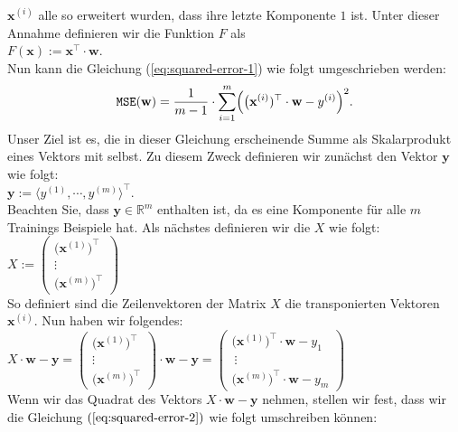 \documentclass[12pt]{article}
\begin{document}
$\mathbf{x}^{(i)}$ alle so erweitert wurden, dass ihre letzte Komponente $1$ ist.  Unter dieser
Annahme definieren wir die
Funktion $F$ als
\\[0.2cm]
\hspace*{1.3cm}
$F(\mathbf{x}) := \mathbf{x}^\top \cdot \mathbf{w}$.
\\[0.2cm]
Nun kann die Gleichung (\ref{eq:squared-error-1}) wie folgt umgeschrieben werden:
\begin{equation}
  \label{eq:squared-error-2}
  \mathtt{MSE}(\mathbf{w}) = \frac{1}{m-1} \cdot \sum\limits_{i=1}^m \Bigl(\bigl(\mathbf{x}^{(i)})^\top \cdot \mathbf{w} - y^{(i)}\Bigr)^2.
\end{equation}
Unser Ziel ist es, die in dieser Gleichung erscheinende Summe als Skalarprodukt eines Vektors mit
selbst.  Zu diesem Zweck definieren wir zunächst den Vektor $\mathbf{y}$ wie folgt:
\\
\hspace*{1.3cm}
$\mathbf{y} := \langle y^{(1)}, \cdots, y^{(m)} \rangle^\top$.
\\[0.2cm]
Beachten Sie, dass $\mathbf{y} \in \mathbb{R}^m$ enthalten ist, da es eine Komponente für alle $m$ Trainings
Beispiele hat.  Als nächstes definieren wir die {\color{blue}{Designmatrix}} $X$ wie folgt:
\\[0.2cm]
\hspace*{1.3cm}
$ X := \left(
  \begin{array}{c}
    \bigl(\mathbf{x}^{(1)}\bigr)^\top \\
    \vdots \\
    \bigl(\mathbf{x}^{(m)}\bigr)^\top
  \end{array}
  \right)   
$
\\[0.2cm]
So definiert sind die Zeilenvektoren der Matrix $X$ die transponierten Vektoren $\mathbf{x}^{(i)}$.
Nun haben wir folgendes:
\\[0.2cm]
\hspace*{1.3cm}
$X \cdot \mathbf{w} - \mathbf{y} = \left(
  \begin{array}{c}
    \bigl(\mathbf{x}^{(1)}\bigr)^\top \\
    \vdots \\
    \bigl(\mathbf{x}^{(m)}\bigr)^\top
  \end{array}
  \right) \cdot \mathbf{w} - \mathbf{y} = \left(
  \begin{array}{c}
    \bigl(\mathbf{x}^{(1)}\bigr)^\top \cdot \mathbf{w} - y_1 \\\
    \vdots \\
    \bigl(\mathbf{x}^{(m)}\bigr)^\top \cdot \mathbf{w} - y_m
  \end{array}
  \right)
$
\\[0.2cm]
Wenn wir das Quadrat des Vektors $X \cdot \mathbf{w} - \mathbf{y}$ nehmen, stellen wir fest, dass wir die Gleichung $\left(\ref{eq:squared-error-2} \right)$ wie folgt umschreiben können:
\end{document}
